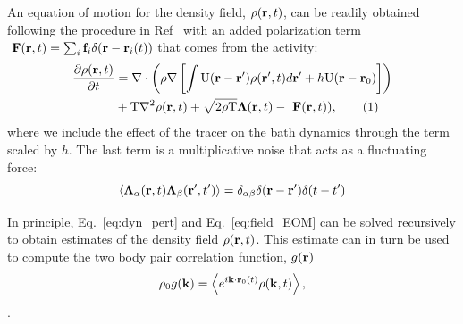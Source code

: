 \documentclass[amsmath,preprintnumbers,10pt,nofootinbib,prl,twocolumn]{revtex4-1}
\newcommand{\F}{\text{ \bf F}}
\newcommand{\T}{\text{T}}
\newcommand{\U}{\text{U}}
\newcommand\numberthis{\addtocounter{equation}{1}\tag{\theequation}}
\begin{document}
An equation of motion for the density field, $\rho({\bf r} , t)$, can be readily obtained following the procedure in Ref~\cite{Dean_1996} with an added polarization term $ \F ({\bf r}, t) = \sum_i {\bf f}_i \delta({\bf r} - {\bf r}_i(t))$ that comes from the activity:
\begin{align*}\label{eq:field_EOM}
    \dfrac{\partial \rho ({\bf r}, t)}{ \partial t} & = \nabla \cdot \left( \rho \nabla \left[ \int  \U({\bf r}  - {\bf r}') \rho({\bf r}', t)  d {\bf r}' +  h\U({\bf r} - {\bf r}_0)  \right] \right) \\
    & + \T \nabla^2 \rho({\bf r}, t) + \sqrt{2 \rho \T} {\bm \Lambda}({\bf r}, t) -\F({\bf r}, t) ), \numberthis
\end{align*}
where we include the effect of the tracer on the bath dynamics through the term scaled by $h$. The last term is a multiplicative noise that acts as a fluctuating force:
\begin{equation}\label{eq:field_noise}
     \langle {\bm \Lambda}_{\alpha} ({\bf r}, t) {\bm \Lambda}_{\beta} ({\bf r}', t') \rangle = \delta_{\alpha \beta} \delta({\bf r} - {\bf r}') \delta(t - t') 
\end{equation}


In principle, Eq.~\ref{eq:dyn_pert} and Eq.~\ref{eq:field_EOM} can be solved recursively to obtain estimates of the density field $\rho({\bf r} , t)$. This estimate can in turn be used to compute the two body pair correlation function, $g({\bf r} )$
\begin{equation}\label{eq:gk}
\rho_0 g({\bf k}) = \left \langle  e^{i{\bf k} \cdot {\bf r}_0 (t) } \rho ({\bf k}, t) \right \rangle,
\end{equation}. 
\end{document}
